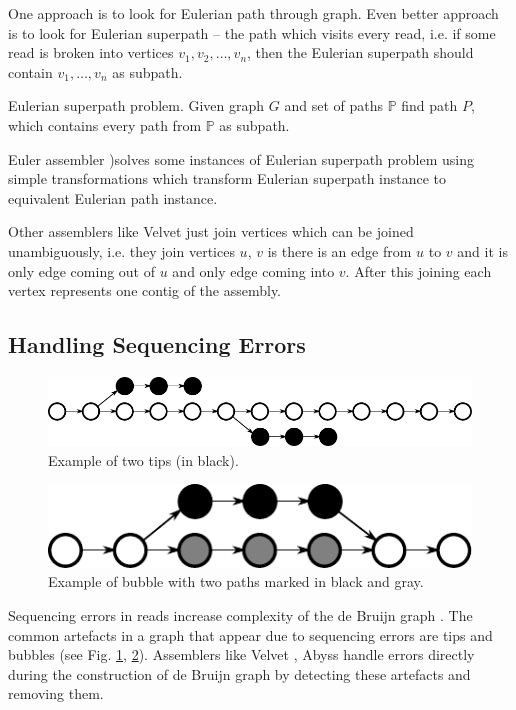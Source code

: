 One approach is to look for Eulerian path through graph.
Even better approach is to look for
Eulerian superpath -- the path which visits every read, i.e. if some read
is broken into vertices $v_1, v_2, \dots, v_n$, then the Eulerian superpath
should contain $v_1, \dots, v_n$ as subpath.

\begin{definition}{Eulerian superpath problem.}
Given graph $G$ and set of paths $\mathbb{P}$ find path $P$, which contains
every path from $\mathbb{P}$ as subpath.
\end{definition}

Euler assembler \citep{pevzner2001eulerian})solves some instances of Eulerian superpath problem
using simple transformations which transform Eulerian superpath instance to equivalent Eulerian path instance.

Other assemblers like Velvet \citep{Velvet} just join vertices which can be joined
unambiguously, i.e. they join vertices $u$, $v$ is there is an edge from $u$ to $v$ and
it is only edge coming out of $u$ and only edge coming into $v$. After this joining
each vertex represents one contig of the assembly.

\subsection{Handling Sequencing Errors}

\begin{figure}
  \centerline{\includegraphics[scale=0.9]{../figures/tips.pdf}}
  \caption{Example of two tips (in black).}
  \label{fig:tips}
\end{figure}

\begin{figure}
  \centerline{\includegraphics[scale=0.9]{../figures/bubble.pdf}}
  \caption{Example of bubble with two paths marked in black and gray.}
  \label{fig:bubble}
\end{figure}

Sequencing errors in reads increase complexity of the de Bruijn graph
\citep{pevzner2001eulerian}. The common artefacts in a graph that
appear due to sequencing errors are tips and bubbles
(see Fig. \ref{fig:tips}, \ref{fig:bubble}). Assemblers like Velvet \citep{Velvet}, Abyss \citep{Abyss} handle
errors directly during the construction of de Bruijn graph by detecting these artefacts
and removing them.

